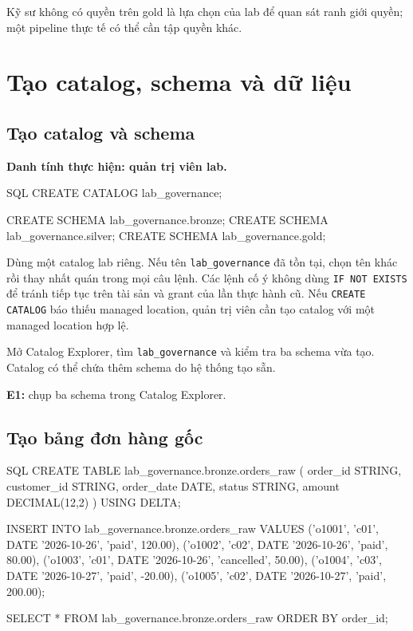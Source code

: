 Kỹ sư không có quyền trên gold là lựa chọn của lab để quan sát ranh giới quyền; một pipeline thực tế có thể cần tập quyền khác.


\section{Tạo catalog, schema và dữ liệu}

\subsection{Tạo catalog và schema}

\textbf{Danh tính thực hiện: quản trị viên lab.}\par\nopagebreak

\begin{aivncodebox}[language={}]{SQL}
CREATE CATALOG lab_governance;

CREATE SCHEMA lab_governance.bronze;
CREATE SCHEMA lab_governance.silver;
CREATE SCHEMA lab_governance.gold;
\end{aivncodebox}

Dùng một catalog lab riêng. Nếu tên \texttt{lab\_\allowbreak{}governance} đã tồn tại, chọn tên khác rồi thay nhất quán trong mọi câu lệnh. Các lệnh cố ý không dùng \texttt{IF NOT EXISTS} để tránh tiếp tục trên tài sản và grant của lần thực hành cũ. Nếu \texttt{CREATE CATALOG} báo thiếu managed location, quản trị viên cần tạo catalog với một managed location hợp lệ.


Mở Catalog Explorer, tìm \texttt{lab\_\allowbreak{}governance} và kiểm tra ba schema vừa tạo. Catalog có thể chứa thêm schema do hệ thống tạo sẵn.


\begin{evidencebox}
\textbf{E1:} chụp ba schema trong Catalog Explorer.
\end{evidencebox}

\subsection{Tạo bảng đơn hàng gốc}

\begin{aivncodebox}[language={}]{SQL}
CREATE TABLE lab_governance.bronze.orders_raw (
    order_id STRING,
    customer_id STRING,
    order_date DATE,
    status STRING,
    amount DECIMAL(12,2)
) USING DELTA;

INSERT INTO lab_governance.bronze.orders_raw VALUES
    ('o1001', 'c01', DATE '2026-10-26', 'paid', 120.00),
    ('o1002', 'c02', DATE '2026-10-26', 'paid', 80.00),
    ('o1003', 'c01', DATE '2026-10-26', 'cancelled', 50.00),
    ('o1004', 'c03', DATE '2026-10-27', 'paid', -20.00),
    ('o1005', 'c02', DATE '2026-10-27', 'paid', 200.00);

SELECT * FROM lab_governance.bronze.orders_raw ORDER BY order_id;
\end{aivncodebox}

